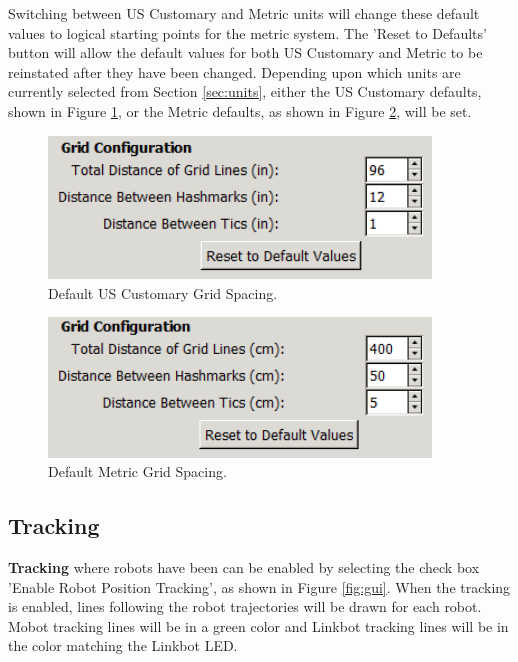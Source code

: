 \documentclass{article}
\begin{document}
Switching between US Customary and Metric units will change these default values
to logical starting points for the metric system.  The 'Reset to Defaults' button
will allow the default values for both US Customary and Metric to be reinstated
after they have been changed.  Depending upon which units are currently selected
from Section \ref{sec:units}, either the US Customary defaults, shown in Figure
\ref{fig:grid_us}, or the Metric defaults, as shown in Figure
\ref{fig:grid_metric}, will be set.
\begin{figure}[H]
	\begin{center}
		\includegraphics[width=4in]{images/grid_us}
	\end{center}
	\caption{Default US Customary Grid Spacing.}
	\label{fig:grid_us}
\end{figure}
\begin{figure}[H]
	\begin{center}
		\includegraphics[width=4in]{images/grid_metric}
	\end{center}
	\caption{Default Metric Grid Spacing.}
	\label{fig:grid_metric}
\end{figure}

\subsection{Tracking}
{\bf Tracking} where robots have been can be enabled by selecting the check box
'Enable Robot Position Tracking', as shown in Figure \ref{fig:gui}.  When the
tracking is enabled, lines following the robot trajectories will be drawn for
each robot.  Mobot tracking lines will be in a green color and Linkbot tracking
lines will be in the color matching the Linkbot LED.
\end{document}

